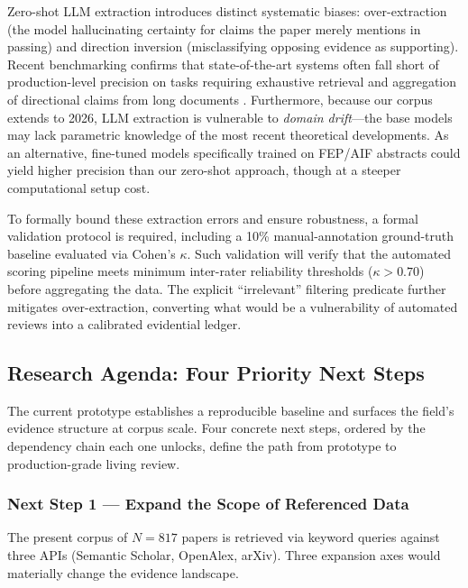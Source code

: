 \documentclass[
  english,
]{article}
\begin{document}
{{{{{{{{{{{{{{{{Zero-shot LLM extraction introduces distinct systematic biases:
over-extraction (the model hallucinating certainty for claims the paper
merely mentions in passing) and direction inversion (misclassifying
opposing evidence as supporting). Recent benchmarking confirms that
state-of-the-art systems often fall short of production-level precision
on tasks requiring exhaustive retrieval and aggregation of directional
claims from long documents \citep{liang2024survey}. Furthermore, because
our corpus extends to 2026, LLM extraction is vulnerable to \emph{domain
drift}---the base models may lack parametric knowledge of the most
recent theoretical developments. As an alternative, fine-tuned models
specifically trained on FEP/AIF abstracts could yield higher precision
than our zero-shot approach, though at a steeper computational setup
cost.

To formally bound these extraction errors and ensure robustness, a
formal validation protocol is required, including a 10\%
manual-annotation ground-truth baseline evaluated via Cohen's
\(\kappa\). Such validation will verify that the automated scoring
pipeline meets minimum inter-rater reliability thresholds
(\(\kappa > 0.70\)) before aggregating the data. The explicit
``irrelevant'' filtering predicate further mitigates over-extraction,
converting what would be a vulnerability of automated reviews into a
calibrated evidential ledger.

\subsection{\texorpdfstring{Research Agenda: Four Priority Next Steps
\label{sec:next_steps}}{Research Agenda: Four Priority Next Steps}}\label{research-agenda-four-priority-next-steps}

The current prototype establishes a reproducible baseline and surfaces
the field's evidence structure at corpus scale. Four concrete next
steps, ordered by the dependency chain each one unlocks, define the path
from prototype to production-grade living review.

\subsubsection{Next Step 1 --- Expand the Scope of Referenced
Data}\label{next-step-1-expand-the-scope-of-referenced-data}

The present corpus of \(N = 817\) papers is retrieved via keyword
queries against three APIs (Semantic Scholar, OpenAlex, arXiv). Three
expansion axes would materially change the evidence landscape.

}}}}}}}}}}}}}}}}
\end{document}
